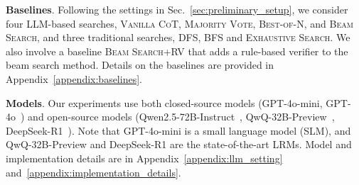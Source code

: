 


\noindent \textbf{Baselines}. Following the settings in Sec.~\ref{sec:preliminary_setup}, we consider four LLM-based searches, \textsc{Vanilla CoT}, \textsc{Majority Vote}, \textsc{Best-of-N}, and \textsc{Beam Search}, and three traditional searches, \textsc{DFS}, \textsc{BFS} and \textsc{Exhaustive Search}. We also involve a baseline \textsc{Beam Search+RV} that adds a rule-based verifier to the beam search method.
Details on the baselines are provided in Appendix~\ref{appendix:baselines}.

\noindent \textbf{Models}. Our experiments use both closed-source models (GPT-4o-mini, GPT-4o~\cite{gpt4ocard}) and open-source models (Qwen2.5-72B-Instruct~\cite{qwen2.5}, QwQ-32B-Preview~\cite{qwq-32b-preview}, DeepSeek-R1~\cite{deepseekai2025deepseekr1}). Note that GPT-4o-mini is a small language model (SLM), and QwQ-32B-Preview and DeepSeek-R1 are the state-of-the-art LRMs. Model and implementation details are in Appendix~\ref{appendix:llm_setting} and~\ref{appendix:implementation_details}.

